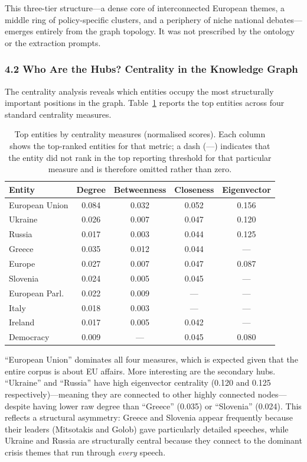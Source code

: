 \documentclass[11pt]{article}
\begin{document}
This three-tier structure---a dense core of interconnected European themes, a middle ring of policy-specific clusters, and a periphery of niche national debates---emerges entirely from the graph topology. It was not prescribed by the ontology or the extraction prompts.


\subsubsection{4.2 Who Are the Hubs? Centrality in the Knowledge Graph}


The centrality analysis reveals which entities occupy the most structurally important positions in the graph. Table~\ref{tab:centrality} reports the top entities across four standard centrality measures.

\begin{table}[h]
\centering
\small
\caption{Top entities by centrality measures (normalised scores). Each column shows the top-ranked entities for that metric; a dash (---) indicates that the entity did not rank in the top reporting threshold for that particular measure and is therefore omitted rather than zero.}
\label{tab:centrality}
\begin{tabular}{lcccc}
\toprule
\textbf{Entity} & \textbf{Degree} & \textbf{Betweenness} & \textbf{Closeness} & \textbf{Eigenvector} \\
\midrule
European Union & 0.084 & 0.032 & 0.052 & 0.156 \\
Ukraine        & 0.026 & 0.007 & 0.047 & 0.120 \\
Russia         & 0.017 & 0.003 & 0.044 & 0.125 \\
Greece         & 0.035 & 0.012 & 0.044 & --- \\
Europe         & 0.027 & 0.007 & 0.047 & 0.087 \\
Slovenia       & 0.024 & 0.005 & 0.045 & --- \\
European Parl. & 0.022 & 0.009 & --- & --- \\
Italy          & 0.018 & 0.003 & --- & --- \\
Ireland        & 0.017 & 0.005 & 0.042 & --- \\
Democracy      & 0.009 & --- & 0.045 & 0.080 \\
\bottomrule
\end{tabular}
\end{table}

``European Union'' dominates all four measures, which is expected given that the entire corpus is about EU affairs. More interesting are the secondary hubs. ``Ukraine'' and ``Russia'' have high eigenvector centrality (0.120 and 0.125 respectively)---meaning they are connected to other highly connected nodes---despite having lower raw degree than ``Greece'' (0.035) or ``Slovenia'' (0.024). This reflects a structural asymmetry: Greece and Slovenia appear frequently because their leaders (Mitsotakis and Golob) gave particularly detailed speeches, while Ukraine and Russia are structurally central because they connect to the dominant crisis themes that run through \emph{every} speech.
\end{document}
